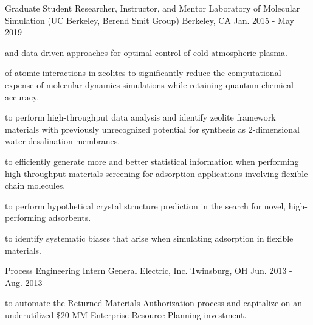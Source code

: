 

\begin{cventries}

  \cventry
    {Graduate Student Researcher, Instructor, and Mentor} %
    {Laboratory of Molecular Simulation (UC Berkeley, Berend Smit Group)} %
    {Berkeley, CA} %
    {Jan. 2015 - May 2019} %
    {
      \begin{cvitems} %
		\item {  and data-driven approaches for optimal control of cold atmospheric plasma.}
		\item {  of atomic interactions in zeolites to significantly reduce the computational expense of molecular dynamics simulations while retaining quantum chemical accuracy.}
        \item { to perform high-throughput data analysis and identify zeolite framework materials with previously unrecognized potential for synthesis as 2-dimensional water desalination membranes.}
        \item { to efficiently generate more and better statistical information when performing high-throughput materials screening for adsorption applications involving flexible chain molecules.}
        \item { to perform hypothetical crystal structure prediction in the search for novel, high-performing adsorbents.}
        \item { to identify systematic biases that arise when simulating adsorption in flexible materials.}
      \end{cvitems}
    }

  \cventry
    {Process Engineering Intern} %
    {General Electric, Inc.} %
    {Twinsburg, OH} %
    {Jun. 2013 - Aug. 2013} %
    {
      \begin{cvitems} %
        \item { to automate the Returned Materials Authorization process and capitalize on an underutilized \$20 MM Enterprise Resource Planning investment.}
      \end{cvitems}
    }


\end{cventries}
